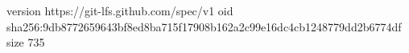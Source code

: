 version https://git-lfs.github.com/spec/v1
oid sha256:9db8772659643bf8ed8ba715f17908b162a2c99e16dc4cb1248779dd2b6774df
size 735
